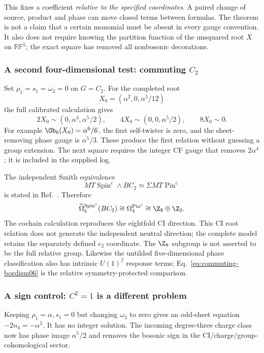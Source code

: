 This fixes a coefficient \emph{relative to the specified coordinates}. A paired change of source, product and phase can move closed terms between formulas. The theorem is not a claim that a certain monomial must be absent in every gauge convention. It also does not require knowing the partition function of the unsquared root $X$ on $\mathbb{RP}^5$; the exact square has removed all nonbosonic decorations.


\subsubsection{A second four-dimensional test: commuting \texorpdfstring{$C_2$}{C2}}
Set ${\rho_1}={s_1}=\omega_2=0$ on $G=C_2$. For the completed root
\begin{equation}
       X_0=(\alpha^2,0,\alpha^5/12)
\end{equation}
the full calibrated calculation gives
\begin{equation}\label{eq:commuting-powers06}
 \boxed{2X_0\sim(0,\alpha^4,\alpha^5/2),\qquad
        4X_0\sim(0,0,\alpha^5/2),\qquad8X_0\sim0.}
\end{equation}
For example $\Ob_6(X_0)=\alpha^6/6$, the first self-twister is zero, and the sheet-removing phase gauge is $\alpha^5/3$. These produce the first relation without guessing a group extension. The next square requires the integer CF gauge that removes $2\alpha^4$; it is included in the supplied log.

The independent Smith equivalence
\begin{equation}
 MT\operatorname{Spin}^c\wedge BC_2\simeq\Sigma MT\operatorname{Pin}^c
\end{equation}
is stated in Ref.~\cite[Example~7.11]{SmithFiber}. Therefore
\begin{equation}\label{eq:commuting-bordism06}
 \widetilde\Omega_5^{\operatorname{Spin}^c}(BC_2)
        \cong\Omega_4^{\operatorname{Pin}^c}
        \cong\Z_8\oplus\Z_2.
\end{equation}
The cochain calculation reproduces the eightfold CI direction. This CI root relation does not generate the independent neutral direction; the complete model retains the separately defined $e_2$ coordinate. The $\Z_8$ subgroup is not asserted to be the full relative group. Likewise the untilded five-dimensional phase classification also has intrinsic $U(1)^f$ response terms; Eq.~\eqref{eq:commuting-bordism06} is the relative symmetry-protected comparison.


\subsubsection{A sign control: \texorpdfstring{$C^2=1$}{C squared equals one} is a different problem}
Keeping ${\rho_1}=\alpha,{s_1}=0$ but changing $\omega_2$ to zero gives an odd-sheet equation $-2n_4=-\alpha^5$. It has no integer solution. The incoming degree-three charge class now has phase image $\alpha^5/2$ and removes the bosonic sign in the CI/charge/group-cohomological sector.

